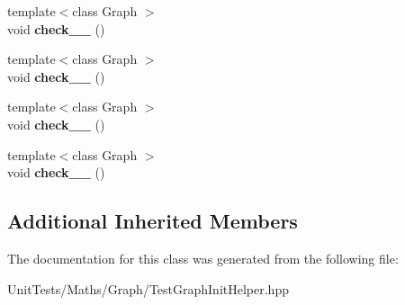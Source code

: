 \begin{DoxyCompactItemize}
\mbox{\label{classsequoia_1_1unit__testing_1_1undirected__init__checker_aef258ead9da7bee9eec709c50836b82a}} 
{\footnotesize template$<$class Graph $>$ }\\void {\bfseries check\+\_\+\_} ()
\item 
\mbox{\label{classsequoia_1_1unit__testing_1_1undirected__init__checker_a633b007495947f4abdab2c183444738c}} 
{\footnotesize template$<$class Graph $>$ }\\void {\bfseries check\+\_\+\_} ()
\item 
\mbox{\label{classsequoia_1_1unit__testing_1_1undirected__init__checker_a4414846448ed47f40db7939e90221d79}} 
{\footnotesize template$<$class Graph $>$ }\\void {\bfseries check\+\_\+\_} ()
\item 
\mbox{\label{classsequoia_1_1unit__testing_1_1undirected__init__checker_a468a702ce3ac8c49d67aa03f08a3734c}} 
{\footnotesize template$<$class Graph $>$ }\\void {\bfseries check\+\_\+\_} ()
\end{DoxyCompactItemize}
\subsection*{Additional Inherited Members}


The documentation for this class was generated from the following file\+:\begin{DoxyCompactItemize}
\item 
Unit\+Tests/\+Maths/\+Graph/Test\+Graph\+Init\+Helper.\+hpp\end{DoxyCompactItemize}
